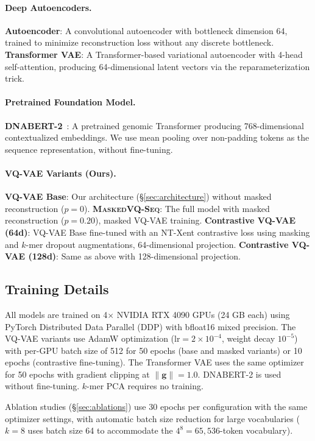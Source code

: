 \documentclass[pmlr]{jmlr}%
\newcommand{\ours}{\textsc{MaskedVQ-Seq}}
\begin{document}
\paragraph{Deep Autoencoders.}
\textbf{Autoencoder}: A convolutional autoencoder with bottleneck dimension 64, trained to minimize reconstruction loss without any discrete bottleneck. \textbf{Transformer VAE}: A Transformer-based variational autoencoder with 4-head self-attention, producing 64-dimensional latent vectors via the reparameterization trick.

\paragraph{Pretrained Foundation Model.}
\textbf{DNABERT-2}~\citep{zhou2023dnabert}: A pretrained genomic Transformer producing 768-dimensional contextualized embeddings. We use mean pooling over non-padding tokens as the sequence representation, without fine-tuning.

\paragraph{VQ-VAE Variants (Ours).}
\textbf{VQ-VAE Base}: Our architecture (\S\ref{sec:architecture}) without masked reconstruction ($p = 0$).
\textbf{\ours{}}: The full model with masked reconstruction ($p = 0.20$), masked VQ-VAE training.
\textbf{Contrastive VQ-VAE (64d)}: VQ-VAE Base fine-tuned with an NT-Xent contrastive loss using masking and $k$-mer dropout augmentations, 64-dimensional projection.
\textbf{Contrastive VQ-VAE (128d)}: Same as above with 128-dimensional projection.

\subsection{Training Details}

All models are trained on 4$\times$ NVIDIA RTX 4090 GPUs (24 GB each) using PyTorch Distributed Data Parallel (DDP) with bfloat16 mixed precision. The VQ-VAE variants use AdamW optimization ($\text{lr} = 2 \times 10^{-4}$, weight decay $10^{-5}$) with per-GPU batch size of 512 for 50 epochs (base and masked variants) or 10 epochs (contrastive fine-tuning). The Transformer VAE uses the same optimizer for 50 epochs with gradient clipping at $\|\mathbf{g}\| = 1.0$. DNABERT-2 is used without fine-tuning. $k$-mer PCA requires no training.

Ablation studies (\S\ref{sec:ablations}) use 30 epochs per configuration with the same optimizer settings, with automatic batch size reduction for large vocabularies ($k = 8$ uses batch size 64 to accommodate the $4^8 = 65{,}536$-token vocabulary).
\end{document}
